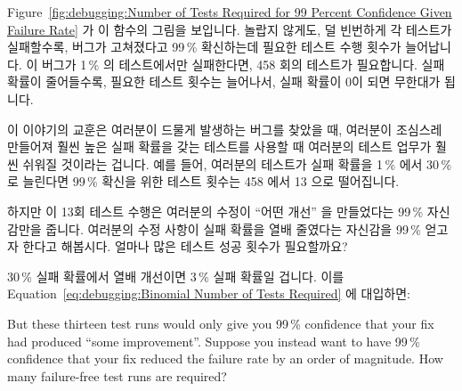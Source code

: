 Figure~\ref{fig:debugging:Number of Tests Required for 99 Percent Confidence Given Failure Rate}
가 이 함수의 그림을 보입니다.
놀랍지 않게도, 덜 빈번하게 각 테스트가 실패할수록, 버그가 고쳐졌다고 99\,\%
확신하는데 필요한 테스트 수행 횟수가 늘어납니다.
이 버그가 1\,\% 의 테스트에서만 실패한다면, 458 회의 테스트가 필요합니다.
실패 확률이 줄어들수록, 필요한 테스트 횟수는 늘어나서, 실패 확률이 0이 되면
무한대가 됩니다.

이 이야기의 교훈은 여러분이 드물게 발생하는 버그를 찾았을 때, 여러분이 조심스레
만들어져 훨씬 높은 실패 확률을 갖는 테스트를 사용할 때 여러분의 테스트 업무가
훨씬 쉬워질 것이라는 겁니다.
예를 들어, 여러분의 테스트가 실패 확률을 1\,\% 에서 30\,\% 로 늘린다면 99\,\%
확신을 위한 테스트 횟수는 458 에서 13 으로 떨어집니다.

하지만 이 13회 테스트 수행은 여러분의 수정이 ``어떤 개선'' 을 만들었다는 99\,\%
자신감만을 줍니다.
여러분의 수정 사항이 실패 확률을 열배 줄였다는 자신감을 99\,\% 얻고자 한다고
해봅시다.
얼마나 많은 테스트 성공 횟수가 필요할까요?

30\,\% 실패 확률에서 열배 개선이면 3\,\% 실패 확률일 겁니다.
이를
Equation~\ref{eq:debugging:Binomial Number of Tests Required} 에 대입하면:

\iffalse

But these thirteen test runs would only give you 99\,\% confidence that
your fix had produced ``some improvement''.
Suppose you instead want to have 99\,\% confidence that your fix reduced
the failure rate by an order of magnitude.
How many failure-free test runs are required?

